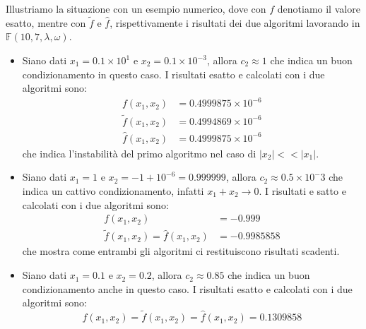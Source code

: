\documentclass{article}
\begin{document}
\begin{example}
    Illustriamo la situazione con un esempio numerico, dove con $f$ denotiamo
    il valore esatto, mentre con $\tilde{f}$ e $\hat{f}$, rispettivamente i
    risultati dei due algoritmi lavorando in
    $\mathbb{F}(10,7,\lambda,\omega)$.
    \begin{itemize}
        \item Siano dati $x_1=0.1\times10^1$ e $x_2=0.1\times10^{-3}$, allora
            $c_2\approx1$ che indica un buon condizionamento in questo caso. I
            risultati esatto e calcolati con i due algoritmi sono:
            \begin{equation*}
               \begin{aligned}
                   f(x_1,x_2)&=0.4999875\times10^{-6}\\
                   \tilde{f}(x_1,x_2)&=0.4994869\times10^{-6}\\
                   \hat{f}(x_1,x_2)&=0.4999875\times10^{-6}
               \end{aligned} 
            \end{equation*}
            che indica l'instabilità del primo algoritmo nel caso di
            $\left\lvert x_2\right\rvert<<\left\lvert x_1\right\rvert$.
        \item Siano dati $x_1=1$ e $x_2=-1+10^{-6}=0.999999$, allora
            $c_2\approx0.5\times10^-3$ che indica un cattivo condizionamento,
            infatti $x_1+x_2\rightarrow 0$. I risultati e satto e calcolati
            con i due algoritmi sono:
            \begin{equation*}
               \begin{aligned}
                   f(x_1,x_2)&=-0.999\\
                   \tilde{f}(x_1,x_2)=\hat{f}(x_1,x_2)&=-0.9985858
               \end{aligned} 
            \end{equation*}
            che mostra come entrambi gli algoritmi ci restituiscono risultati
            scadenti.
        \item Siano dati $x_1=0.1$ e $x_2=0.2$, allora $c_2\approx0.85$ che
            indica un buon condizionamento anche in questo caso. I risultati esatto
            e calcolati con i due algoritmi sono:
            $$f(x_1,x_2)=\tilde{f}(x_1,x_2)=\hat{f}(x_1,x_2)=0.1309858$$
    \end{itemize}
\end{example}
\newpage
\end{document}
